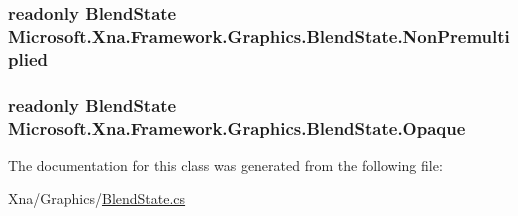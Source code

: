\subsubsection[{Non\+Premultiplied}]{\setlength{\rightskip}{0pt plus 5cm}readonly {\bf Blend\+State} Microsoft.\+Xna.\+Framework.\+Graphics.\+Blend\+State.\+Non\+Premultiplied\hspace{0.3cm}{\ttfamily [static]}}\label{class_microsoft_1_1_xna_1_1_framework_1_1_graphics_1_1_blend_state_a3e766ba82fbaefab9571509d4a51319c}
\hypertarget{class_microsoft_1_1_xna_1_1_framework_1_1_graphics_1_1_blend_state_a18cd0e96d0f213101fa1d90ac120b43c}{}
\subsubsection[{Opaque}]{\setlength{\rightskip}{0pt plus 5cm}readonly {\bf Blend\+State} Microsoft.\+Xna.\+Framework.\+Graphics.\+Blend\+State.\+Opaque\hspace{0.3cm}{\ttfamily [static]}}\label{class_microsoft_1_1_xna_1_1_framework_1_1_graphics_1_1_blend_state_a18cd0e96d0f213101fa1d90ac120b43c}


The documentation for this class was generated from the following file\+:\begin{DoxyCompactItemize}
\item 
Xna/\+Graphics/\hyperlink{_blend_state_8cs}{Blend\+State.\+cs}\end{DoxyCompactItemize}
